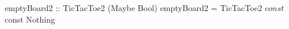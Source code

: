 \begin{code}
emptyBoard2 :: TicTacToe2 (Maybe Bool)
emptyBoard2 =
  TicTacToe2 $ const $ const Nothing
\end{code}
